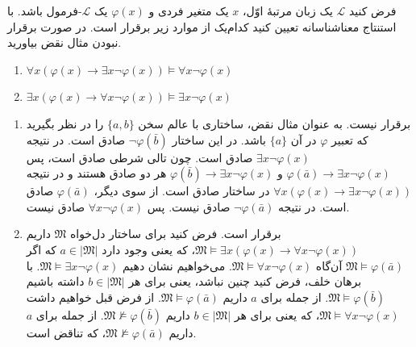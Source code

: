فرض کنید $\mathcal{L}$ یک زبان مرتبهٔ اوّل، $x$ یک متغیر فردی و $\varphi(x)$ یک $\mathcal{L}$-فرمول باشد. با استنتاج معناشناسانه تعیین کنید کدام‌یک از موارد زیر برقرار است. در صورت برقرار نبودن مثال نقض بیاورید.
\begin{enumerate}[label=(\alph*)]
  \item $\forall x (\varphi(x) \to \exists x \neg \varphi(x)) \vDash \forall x \neg \varphi(x)$
  ~
  \item $\exists x (\varphi(x) \to \forall x \neg \varphi(x)) \vDash \exists x \neg \varphi(x)$
  ~
\end{enumerate} \quad
\begin{ans}
  \begin{enumerate}[label=(\alph*)]
    \item برقرار نیست. به عنوان مثال نقض، ساختاری با عالم سخن $\{ a, b \}$ را در نظر بگیرید که تعبیر $\varphi$ در آن $\{ a \}$ باشد. در این ساختار $\neg \varphi(\bar{b})$ صادق است. در نتیجه $\exists x \neg \varphi(x)$ صادق است. چون تالی شرطی صادق است، پس $\varphi(\bar{a}) \to \exists x \neg \varphi(x)$ و $\varphi(\bar{b}) \to \exists x \neg \varphi(x)$ هر دو صادق هستند و در نتیجه $\forall x (\varphi(x) \to \exists x \neg \varphi(x))$ در ساختار صادق است. از سوی دیگر، $\varphi(\bar{a})$ صادق است. در نتیجه $\neg \varphi(\bar{a})$ صادق نیست. پس $\forall x \neg \varphi(x)$ صادق نیست.
    \item برقرار است. فرض کنید برای ساختار دل‌خواه $\mathfrak{M}$ داریم $\mathfrak{M} \vDash \exists x (\varphi(x) \to \forall x \neg \varphi(x))$، که یعنی وجود دارد $a \in |\mathfrak{M}|$ که اگر $\mathfrak{M} \vDash \varphi(\bar{a})$ آن‌گاه $\mathfrak{M} \vDash \forall x \neg \varphi(x)$. می‌خواهیم نشان دهیم $\mathfrak{M} \vDash \exists x \neg \varphi(x)$. با برهان خلف، فرض کنید چنین نباشد، یعنی برای هر $b \in |\mathfrak{M}|$ داشته باشیم $\mathfrak{M} \vDash \varphi(\bar{b})$. از جمله برای $a$ داریم $\mathfrak{M} \vDash \varphi(\bar{a})$. از فرض قبل خواهیم داشت $\mathfrak{M} \vDash \forall x \neg \varphi(x)$، که یعنی برای هر $b \in |\mathfrak{M}|$ داریم $\mathfrak{M} \not\vDash \varphi(\bar{b})$. از جمله برای $a$ داریم $\mathfrak{M} \not\vDash \varphi(\bar{a})$، که تناقض است.
  \end{enumerate}
\end{ans}